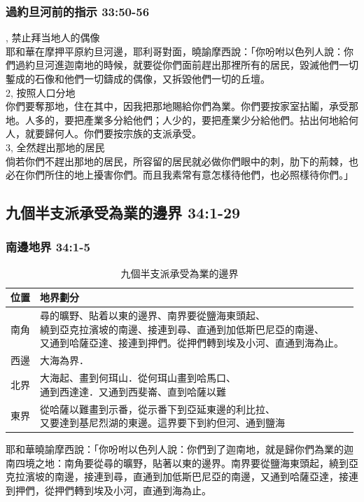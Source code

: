 

\subsubsection{過約旦河前的指示 33:50-56}
, 禁止拜当地人的偶像\\
耶和華在摩押平原約旦河邊，耶利哥對面，曉諭摩西說：「你吩咐以色列人說：你們過約旦河進迦南地的時候，就要從你們面前趕出那裡所有的居民，毀滅他們一切鏨成的石像和他們一切鑄成的偶像，又拆毀他們一切的丘壇。\\
2, 按照人口分地\\
你們要奪那地，住在其中，因我把那地賜給你們為業。你們要按家室拈鬮，承受那地。人多的，要把產業多分給他們；人少的，要把產業少分給他們。拈出何地給何人，就要歸何人。你們要按宗族的支派承受。\\
3, 全然趕出那地的居民\\
倘若你們不趕出那地的居民，所容留的居民就必做你們眼中的刺，肋下的荊棘，也必在你們所住的地上擾害你們。而且我素常有意怎樣待他們，也必照樣待你們。」

\subsection{九個半支派承受為業的邊界  34:1-29}
\subsubsection{南邊地界 34:1-5}
\begin{table}
\vspace*{-8mm}
\centering
\begin{tabular}{|c|l|}\hline
\hline
位置  &地界劃分      \\ \hline\hline 
南角&\shortstack{尋的曠野、貼着以東的邊界、南界要從鹽海東頭起、\\繞到亞克拉濱坡的南邊、接連到尋、直通到加低斯巴尼亞的南邊、\\又通到哈薩亞達、接連到押們。從押們轉到埃及小河、直通到海為止。}\    \\ \hline
西邊&大海為界．\\  \hline
北界  &\shortstack{大海起、畫到何珥山．從何珥山畫到哈馬口、\\通到西達達．又通到西斐崙、直到哈薩以難}\ \\ \hline
東界&\shortstack{從哈薩以難畫到示番，從示番下到亞延東邊的利比拉、\\又要達到基尼烈湖的東邊。這界要下到約但河、通到鹽海}\ \\ \hline
\end{tabular}
\caption{九個半支派承受為業的邊界}
\end{table}
耶和華曉諭摩西說：「你吩咐以色列人說：你們到了迦南地，就是歸你們為業的迦南四境之地：南角要從尋的曠野，貼著以東的邊界。南界要從鹽海東頭起，繞到亞克拉濱坡的南邊，接連到尋，直通到加低斯巴尼亞的南邊，又通到哈薩亞達，接連到押們，從押們轉到埃及小河，直通到海為止。

